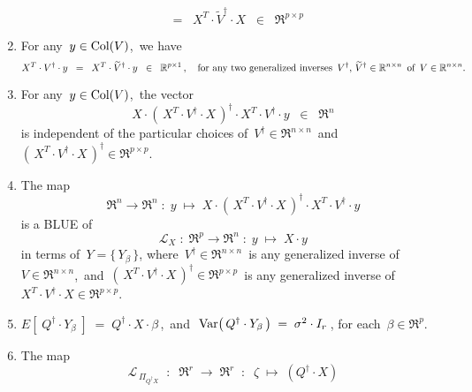 \begin{theorem}
\begin{enumerate}
\begin{equation*}
	\;\; = \;\;
	X^{T} \cdot \widetilde{V}^{\dagger} \cdot X
	\;\; \in \;\; \Re^{p \times p}
	\end{equation*}
\item\label{XtVdaggerY}
	For any \,$y \in \Col(V)$,\, we have
	\begin{equation*}
	X^{T} \cdot V^{\dagger} \cdot y
	\;\; = \;\;
	X^{T} \cdot \widetilde{V}^{\dagger} \cdot y
	\;\; \in \;\; \Re^{p \times 1}\,,
	\quad
	\textnormal{for any two generalized inverses
	\,$V^{\dagger},\, \widetilde{V}^{\dagger} \in \Re^{n \times n}$\,
	of \,$V \in \Re^{n \times n}$}.
	\end{equation*}	
\item\label{XXtVdaggerXXtVdaggerY}
	For any \,$y \in \Col(V)$,\, the vector
	\begin{equation*}
	X \cdot \left(\,X^{T} \cdot V^{\dagger} \cdot X\,\right)^{\dagger} \cdot X^{T} \cdot V^{\dagger} \cdot y \;\; \in \;\; \Re^{n}
	\end{equation*}
	is independent of the particular choices of
	\,$V^{\dagger} \in \Re^{n \times n}$\,
	and
	\,$\left(\,X^{T} \cdot V^{\dagger} \cdot X\,\right)^{\dagger} \in \Re^{p \times p}$.
\item
	The map
	\begin{equation*}
	\Re^{n} \longrightarrow \Re^{n}
	\; : \; y \; \longmapsto \;
	X \cdot \left(\,X^{T} \cdot V^{\dagger} \cdot X\,\right)^{\dagger} \cdot X^{T} \cdot V^{\dagger} \cdot y
	\end{equation*}
	is a BLUE of
	\begin{equation*}
	\mathcal{L}_{X} \; : \; \Re^{p} \longrightarrow \Re^{n} \; : \; y \; \longmapsto \; X \cdot y
	\end{equation*}
	in terms of
	\,$Y = \{\,Y_{\beta}\,\}$,
	where
	\,$V^{\dagger} \in \Re^{n \times n}$\, is any generalized inverse of \,$V \in \Re^{n \times n}$,\,
	and
	\,$\left(\,X^{T} \cdot V^{\dagger} \cdot X\,\right)^{\dagger} \in \Re^{p \times p}$\,
	is any generalized inverse of
	\,$X^{T} \cdot V^{\dagger} \cdot X \in \Re^{p \times p}$.
\item
	$E\!\left[\;Q^{\dagger} \cdot Y_{\beta}\;\right] \; = \; Q^{\dagger} \cdot X \cdot \beta$\,,
	\,and\,
	\,$\Var\!\left(\,Q^{\dagger} \cdot Y_{\beta}\,\right) \; = \; \sigma^{2} \cdot I_{r}$\,,
	for each \,$\beta \in \Re^{p}$.
\item
	The map
	\begin{equation*}
	\mathcal{L}_{\,\Pi_{Q^{\dagger}X}}
	\;\; : \;\; \Re^{r} \; \longrightarrow \; \Re^{r}
	\;\; : \;\; \zeta \; \longmapsto \;
		(Q^{\dagger} \cdot X)

\end{equation*}
\end{enumerate}
\end{theorem}
